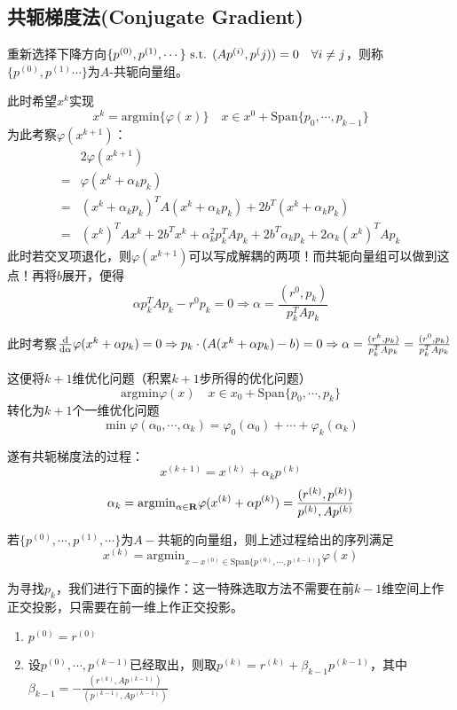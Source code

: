 \documentclass{ctexart}
\begin{document}
\subsection{共轭梯度法(Conjugate Gradient)}
重新选择下降方向$\{p^{(0)},p^{(1)},\cdots\}\text{ s.t. }(Ap^{(i)},p^(j))=0\quad\forall i\neq j$，则称$\{p^{(0)},p^{(1)}\cdots\}$为$A$-共轭向量组。

此时希望$x^k$实现
\[x^k=\mathrm{argmin}\{\varphi(x)\}\quad x\in x^0+\mathrm{Span}\{p_0,\cdots,p_{k-1}\}\]
为此考察$\varphi(x^{k+1})$：
\begin{align*}
&2\varphi(x^{k+1})\\
=&\varphi(x^k+\alpha_kp_k)\\
=&(x^k+\alpha_kp_k)^TA(x^k+\alpha_kp_k)+2b^T(x^k+\alpha_kp_k)\\
=&(x^k)^TAx^k+2b^Tx^k+\alpha^2_kp_k^TAp_k+2b^T\alpha_kp_k+2\alpha_k(x^k)^TAp_k
\end{align*}
此时若交叉项退化，则$\varphi(x^{k+1})$可以写成解耦的两项！而共轭向量组可以做到这点！再将$b$展开，便得
\[\alpha p^T_kAp_k-r^0p_k=0\Rightarrow \alpha=\frac{(r^0,p_k)}{p^T_kAp_k}\]

此时考察$\frac{\mathrm{d}}{\mathrm{d}\alpha}\varphi(x^k+\alpha p_k)=0\Rightarrow p_k\cdot(A(x^k+\alpha p_k)-b)=0\Rightarrow \alpha=\frac{(r^k,p_k)}{p^T_kAp_k}=\frac{(r^0,p_k)}{p^T_kAp_k}$

这便将$k+1$维优化问题（积累$k+1$步所得的优化问题）
\[\mathrm{argmin}\varphi(x)\quad x\in x_0+\mathrm{Span}\{p_0,\cdots,p_k\}\]
转化为$k+1$个一维优化问题
\[\min\varphi(\alpha_0,\cdots,\alpha_k)=\varphi_0(\alpha_0)+\cdots+\varphi_k(\alpha_k)\]

遂有共轭梯度法的过程：
\[x^{(k+1)}=x^{(k)}+\alpha_kp^{(k)}\]
\[\alpha_k=\mathrm{argmin}_{\alpha\in\mathbf{R}}\varphi(x^{(k)}+\alpha p^{(k)})=\frac{(r^{(k)},p^{(k)})}{p^{(k)},Ap^{(k)}}\]


\begin{Thm}
若$\{p^{(0)},\cdots, p^{(1)},\cdots\}$为$A-$共轭的向量组，则上述过程给出的序列满足
\[x^{(k)}=\mathrm{argmin}_{x-x^{(0)}\in \mathrm{Span}\{p^{(0)},\cdots, p^{(k-1)}\}}\varphi(x)\]

\end{Thm}


为寻找$p_k$，我们进行下面的操作：这一特殊选取方法不需要在前$k-1$维空间上作正交投影，只需要在前一维上作正交投影。
\begin{enumerate}
\item $p^{(0)}=r^{(0)}$
\item 设$p^{(0)},\cdots,p^{(k-1)}$已经取出，则取$p^{(k)}=r^{(k)}+\beta_{k-1}p^{(k-1)}$，其中$\beta_{k-1}=-\frac{(r^{(k)},Ap^{(k-1)})}{(p^{(k-1)},Ap^{(k-1)})}$
\end{enumerate}
\end{document}
